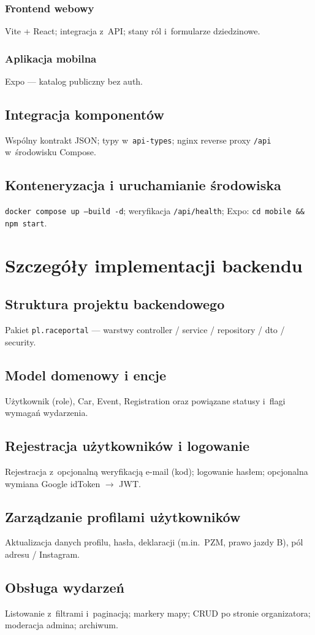 \documentclass{sprz}
\begin{document}
\subsection{Frontend webowy}
Vite + React; integracja z~API; stany ról i~formularze dziedzinowe.
\subsection{Aplikacja mobilna}
Expo --- katalog publiczny bez auth.
\section{Integracja komponentów}
Wspólny kontrakt JSON; typy w~\texttt{api-types}; nginx reverse proxy \texttt{/api} w~środowisku Compose.
\section{Konteneryzacja i uruchamianie środowiska}
\texttt{docker compose up --build -d}; weryfikacja \texttt{/api/health}; Expo: \texttt{cd mobile \&\& npm start}.

\chapter{Szczegóły implementacji backendu}
\section{Struktura projektu backendowego}
Pakiet \texttt{pl.raceportal} --- warstwy controller / service / repository / dto / security.
\section{Model domenowy i encje}
Użytkownik (role), Car, Event, Registration oraz powiązane statusy i~flagi wymagań wydarzenia.
\section{Rejestracja użytkowników i logowanie}
Rejestracja z~opcjonalną weryfikacją e-mail (kod); logowanie hasłem; opcjonalna wymiana Google idToken $\rightarrow$ JWT.
\section{Zarządzanie profilami użytkowników}
Aktualizacja danych profilu, hasła, deklaracji (m.in.\ PZM, prawo jazdy B), pól adresu / Instagram.
\section{Obsługa wydarzeń}
Listowanie z~filtrami i~paginacją; markery mapy; CRUD po stronie organizatora; moderacja admina; archiwum.
\end{document}
